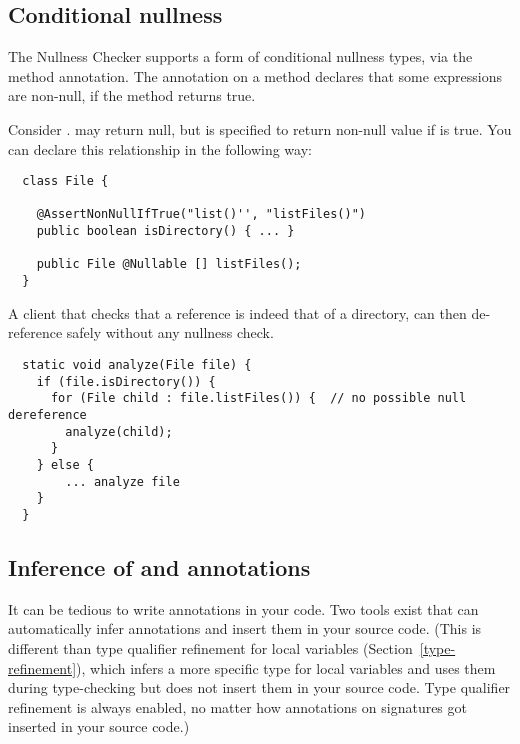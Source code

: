 \subsection{Conditional nullness}

The Nullness Checker supports a form of conditional nullness types, via the
 method annotation.
The annotation on a method declares that some expressions are non-null, if
the method returns true.

Consider .
 may
return null, but is specified to return non-null value if
 is
true.  You can declare this relationship in the following way:

\begin{Verbatim}
  class File {

    @AssertNonNullIfTrue("list()'', "listFiles()")
    public boolean isDirectory() { ... }

    public File @Nullable [] listFiles();
  }
\end{Verbatim}

A client that checks that a  reference is indeed that of a directory,
can then de-reference  safely without any nullness check.

\begin{Verbatim}
  static void analyze(File file) {
    if (file.isDirectory()) {
      for (File child : file.listFiles()) {  // no possible null dereference
        analyze(child);
      }
    } else {
        ... analyze file
    }
  }
\end{Verbatim}


\subsection{Inference of  and  annotations\label{nullness-inference}}

It can be tedious to write annotations in your code.  Two tools exist that
can automatically infer annotations and insert them in your source code.
(This is different than type qualifier refinement for local variables
(Section~\ref{type-refinement}), which infers a more specific type for
local variables and uses them during type-checking but does not insert them
in your source code.  Type qualifier refinement is always enabled, no
matter how annotations on signatures got inserted in your source code.)

